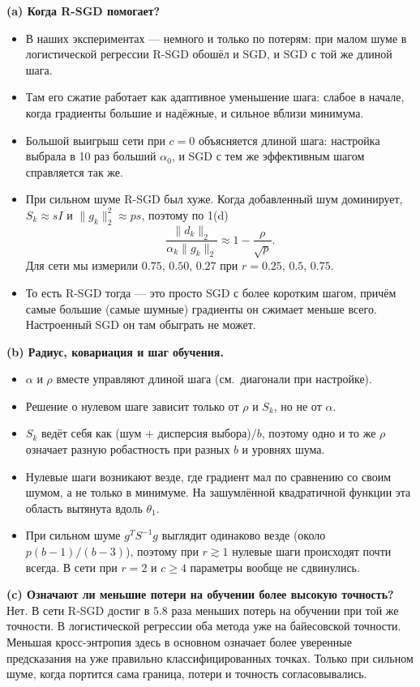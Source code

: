 \documentclass[11pt,a4paper]{article}
\newcommand{\norm}[1]{\lVert #1\rVert_2}
\begin{document}
\textbf{(a) Когда R-SGD помогает?}
\begin{itemize}
\item В наших экспериментах — немного и только по потерям: при малом шуме в логистической регрессии
R-SGD обошёл и SGD, и SGD с той же длиной шага.
\item Там его сжатие работает как адаптивное уменьшение шага: слабое в начале, когда градиенты
большие и надёжные, и сильное вблизи минимума.
\item Большой выигрыш сети при $c=0$ объясняется длиной шага: настройка выбрала в 10 раз больший
$\alpha_0$, и SGD с тем же эффективным шагом справляется так же.
\item При сильном шуме R-SGD был хуже. Когда добавленный шум доминирует, $S_k\approx sI$ и
$\norm{g_k}^2\approx ps$, поэтому по 1(d)
\begin{equation*}
\frac{\norm{d_k}}{\alpha_k\norm{g_k}}\approx1-\frac{\rho}{\sqrt p}.
\end{equation*}
Для сети мы измерили $0.75$, $0.50$, $0.27$ при $r=0.25$, $0.5$, $0.75$.
\item То есть R-SGD тогда — это просто SGD с более коротким шагом, причём самые большие (самые
шумные) градиенты он сжимает меньше всего. Настроенный SGD он там обыграть не может.
\end{itemize}

\textbf{(b) Радиус, ковариация и шаг обучения.}
\begin{itemize}
\item $\alpha$ и $\rho$ вместе управляют длиной шага (см.\ диагонали при настройке).
\item Решение о нулевом шаге зависит только от $\rho$ и $S_k$, но не от $\alpha$.
\item $S_k$ ведёт себя как (шум $+$ дисперсия выбора)$/b$, поэтому одно и то же $\rho$ означает
разную робастность при разных $b$ и уровнях шума.
\item Нулевые шаги возникают везде, где градиент мал по сравнению со своим шумом, а не только в
минимуме. На зашумлённой квадратичной функции эта область вытянута вдоль $\theta_1$.
\item При сильном шуме $g^TS^{-1}g$ выглядит одинаково везде (около $p(b-1)/(b-3)$), поэтому при
$r\gtrsim1$ нулевые шаги происходят почти всегда. В сети при $r=2$ и $c\ge4$ параметры вообще не
сдвинулись.
\end{itemize}

\textbf{(c) Означают ли меньшие потери на обучении более высокую точность?} Нет. В сети R-SGD
достиг в $5.8$ раза меньших потерь на обучении при той же точности. В логистической регрессии оба
метода уже на байесовской точности. Меньшая кросс-энтропия здесь в основном означает более уверенные
предсказания на уже правильно классифицированных точках. Только при сильном шуме, когда портится сама
граница, потери и точность согласовывались.
\end{document}
